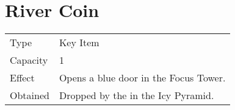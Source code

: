 \section{River Coin}
\label{item:river_coin}


\noindent\begin{tabularx}{\textwidth}[l]{lX}
	Type
	& Key Item
\\ %
	Capacity
	& 1
\\ %
	Effect
	& Opens a blue door in the Focus Tower.
\\ %
	Obtained
	& Dropped by the \nameref{monster:ice_golem} in the Icy Pyramid.
\end{tabularx}
